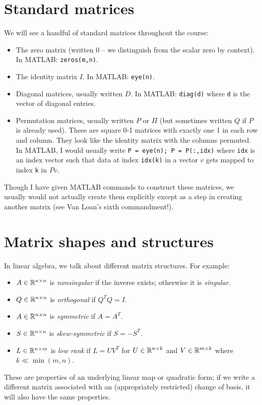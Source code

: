 \documentclass[12pt, leqno]{article}
\begin{document}
\section*{Standard matrices}

We will see a handful of standard matrices throughout the
course:
\begin{itemize}
\item The zero matrix (written $0$ -- we distinguish from the scalar
  zero by context).  In MATLAB: {\tt zeros(m,n)}.
\item The identity matrix $I$.  In MATLAB: {\tt eye(n)}.
\item Diagonal matrices, usually written $D$.  In MATLAB:
  {\tt diag(d)} where {\tt d} is the vector of diagonal entries.
\item Permutation matrices, usually written $P$ or $\Pi$ (but
  sometimes written $Q$ if $P$ is already used).  These are square 0-1
  matrices with exactly one 1 in each row and column.  They look like
  the identity matrix with the columns permuted.  In MATLAB, I would
  usually write {\tt P = eye(n); P = P(:,idx)} where {\tt idx} is an
  index vector such that data at index {\tt idx(k)} in a vector $v$
  gets mapped to index {\tt k} in $Pv$.
\end{itemize}
Though I have given MATLAB commands to construct these matrices,
we usually would not actually create them explicitly except as a
step in creating another matrix (see Van Loan's sixth commandment!).

\section*{Matrix shapes and structures}

In linear algebra, we talk about different matrix structures.
For example:
\begin{itemize}
\item $A \in \mathbb{R}^{n \times n}$ is {\em nonsingular} if the inverse
  exists; otherwise it is {\em singular}.
\item $Q \in \mathbb{R}^{n \times n}$ is {\em orthogonal} if $Q^T Q = I$.
\item $A \in \mathbb{R}^{n \times n}$ is {\em symmetric} if $A = A^T$.
\item $S \in \mathbb{R}^{n \times n}$ is {\em skew-symmetric} if $S = -S^T$.
\item $L \in \mathbb{R}^{n \times m}$ is {\em low rank} if $L = UV^T$
  for $U \in \mathbb{R}^{n \times k}$ and $V \in \mathbb{R}^{m \times k}$ where
  $k \ll \min(m,n)$.
\end{itemize}
These are properties of an underlying linear map or quadratic form; if
we write a different matrix associated with an (appropriately
restricted) change of basis, it will also have the same properties.
\end{document}
